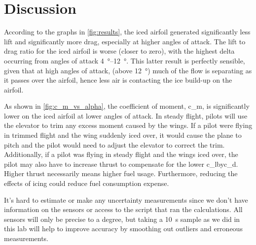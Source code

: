 \chapter{Discussion} \label{cp:discussion}

According to the graphs in \autoref{fig:results}, the iced airfoil generated significantly less lift and significantly more drag, especially at higher angles of attack. The lift to drag ratio for the iced airfoil is worse (closer to zero), with the highest delta occurring from angles of attack \qtyrange{4}{12}{\degree}. This latter result is perfectly sensible, given that at high angles of attack, (above \qty{12}{\degree}) much of the flow is separating as it passes over the airfoil, hence less air is contacting the ice build-up on the airfoil.

As shown in \autoref{fig:c_m_vs_alpha}, the coefficient of moment, \gls{c_m}, is significantly lower on the iced airfoil at lower angles of attack. In steady flight, pilots will use the elevator to trim any excess moment caused by the wings. If a pilot were flying in trimmed flight and the wing suddenly iced over, it would cause the plane to pitch and the pilot would need to adjust the elevator to correct the trim. Additionally, if a pilot was flying in steady flight and the wings iced over, the pilot may also have to increase thrust to compensate for the lower \gls{c_lbyc_d}. Higher thrust necessarily means higher fuel usage. Furthermore, reducing the effects of icing could reduce fuel consumption expense.

It's hard to estimate or make any uncertainty measurements since we don't have information on the sensors or access to the script that ran the calculations. All sensors will only be precise to a degree, but taking a \qty{10}{\second} sample as we did in this lab will help to improve accuracy by smoothing out outliers and erroneous measurements. 